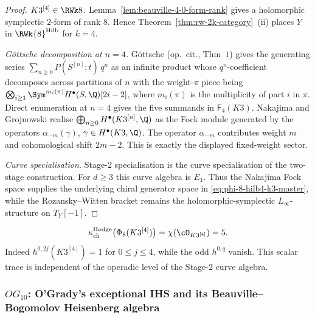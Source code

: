 \begin{proof}
\emph{\(K3^{[4]}\in\RWk8\).}
Lemma~\ref{lem:beauville-4-0-form-rank} gives a holomorphic symplectic
\(2\)-form of rank \(8\). Hence
Theorem~\ref{thm:rw-2k-category}~(ii) places $Y$ in
$\RWk{8}^{\mathrm{Hilb}}$ for $k = 4$.

\emph{G\"ottsche decomposition at $n = 4$.}
G\"ottsche (op.\ cit., Thm~$1$) gives the generating series
$\sum_{n \ge 0} P(S^{[n]}; t)\, q^n$ as an infinite product whose
$q^n$-coefficient decomposes across partitions of $n$ with the
weight-$\pi$ piece being
$\bigotimes_{i \ge 1} \Sym^{m_i(\pi)} H^\bullet(S, \Q)[2i-2]$, where
$m_i(\pi)$ is the multiplicity of part $i$ in $\pi$. Direct enumeration
at \(n=4\) gives the five summands in \(\mathsf F_4(K3)\).
Nakajima and Grojnowski realise
\(\bigoplus_{n\ge0}H^\bullet(K3^{[n]},\Q)\) as the Fock module generated
by the operators \(\alpha_{-m}(\gamma)\), \(\gamma\in H^\bullet(K3,\Q)\).
The operator \(\alpha_{-m}\) contributes weight \(m\) and cohomological
shift \(2m-2\). This is exactly the displayed fixed-weight sector.

\emph{Curve specialisation.}
Stage-$2$ specialisation is the curve specialisation of the two-stage
construction. For \(d\ge3\) this curve algebra is \(E_1\). Thus the
Nakajima Fock space supplies the underlying chiral generator space in
\eqref{eq:phi-8-hilb4-k3-master}, while the Rozansky--Witten bracket remains
the holomorphic-symplectic \(L_\infty\)-structure on \(T_Y[-1]\).
\end{proof}

\begin{remark}
\label{rem:phi-8-hilb4-sc-ch-top}
%
\[
\kappa_{\mathrm{ch}}^{\mathrm{Hodge}}\bigl(\Phi_8(K3^{[4]})\bigr)
=\chi(\cO_{K3^{[4]}})=5.
\]
Indeed \(h^{0,2j}(K3^{[4]})=1\) for \(0\le j\le4\), while the odd
\(h^{0,q}\) vanish. This scalar trace is independent of the operadic level
of the Stage-$2$ curve algebra.
\end{remark}

\subsubsection{\texorpdfstring{$OG_{10}$}{OG-10}: O'Grady's exceptional IHS and its
Beauville--Bogomolov Heisenberg algebra}
\label{subsubsec:phi-10-og10-explicit}

